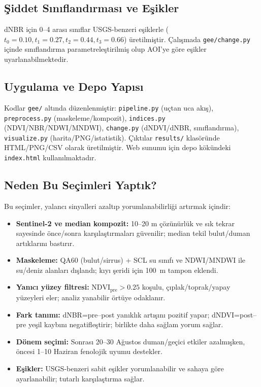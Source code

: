\documentclass[11pt,a4paper]{article}
\begin{document}
\subsection{Şiddet Sınıflandırması ve Eşikler}
dNBR için 0--4 arası sınıflar USGS-benzeri eşiklerle (\(t_0=0.10, t_1=0.27, t_2=0.44, t_3=0.66\)) üretilmiştir. Çalışmada \texttt{gee/change.py} içinde sınıflandırma parametreleştirilmiş olup AOI'ye göre eşikler uyarlanabilmektedir.

\subsection{Uygulama ve Depo Yapısı}
Kodlar \texttt{gee/} altında düzenlenmiştir: \texttt{pipeline.py} (uçtan uca akış), \texttt{preprocess.py} (maskeleme/kompozit), \texttt{indices.py} (NDVI/NBR/NDWI/MNDWI), \texttt{change.py} (dNDVI/dNBR, sınıflandırma), \texttt{visualize.py} (harita/PNG/istatistik). Çıktılar \texttt{results/} klasöründe HTML/PNG/CSV olarak üretilmiştir. Web sunumu için depo kökündeki \texttt{index.html} kullanılmaktadır.

\subsection{Neden Bu Seçimleri Yaptık?}
Bu seçimler, yalancı sinyalleri azaltıp yorumlanabilirliği artırmak içindir:
\begin{itemize}
  \item \textbf{Sentinel-2 ve median kompozit:} 10--20 m çözünürlük ve sık tekrar sayesinde önce/sonra karşılaştırmaları güvenilir; median tekil bulut/duman artıklarını bastırır.
  \item \textbf{Maskeleme:} QA60 (bulut/sirrus) + SCL su sınıfı ve NDWI/MNDWI ile su/deniz alanları dışlandı; kıyı şeridi için \SI{100}{m} tampon eklendi.
  \item \textbf{Yanıcı yüzey filtresi:} \(\mathrm{NDVI}_{\text{pre}}>0.25\) koşulu, çıplak/toprak/yapay yüzeyleri eler; analiz yanabilir örtüye odaklanır.
  \item \textbf{Fark tanımı:} dNBR=pre--post yanıklık artışını pozitif yapar; dNDVI=post--pre yeşil kaybını negatifleştirir; birlikte daha sağlam yorum sağlar.
  \item \textbf{Dönem seçimi:} Sonrası 20--30 Ağustos duman/geçici etkiler azalmışken, öncesi 1--10 Haziran fenolojik uyumu destekler.
  \item \textbf{Eşikler:} USGS-benzeri sabit eşikler yorumlanabilir ve sahaya göre ayarlanabilir; tutarlı karşılaştırma sağlar.
\end{itemize}
\end{document}
